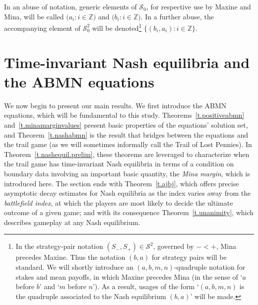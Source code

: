 \documentclass[letterpaper,11pt,oneside,reqno]{amsbook}
\newcommand{\Z}{\ensuremath{\mathbb{Z}}}
\numberwithin{figure}{chapter}
\theoremstyle{definition}
\theoremstyle{definition}
\theoremstyle{definition}
\theoremstyle{definition}
\theoremstyle{definition}
\newcommand{\mc}{\mathcal}
\newcommand{\tis}{\mc{S}_0}
\newcommand{\abmnmacspace}{\textrm{ABMN} }
\def\hfff#1{\label{#1}}
\begin{document}
In an abuse of notation,
generic elements of $\tis$, for respective use by Maxine and Mina, will be called
 $\big(a_i:i\in \Z)$ and  $\big(b_i:i\in \Z \big)$. In a further abuse,\hfff{notab} the accompanying element of $\tis^2$
 will be denoted\footnote{In the strategy-pair notation $(S_-,S_+) \in \mc{S}^2$, governed by $- < +$, Mina precedes Maxine. Thus the notation $(b,a)$ for strategy pairs will be standard. We will shortly introduce an $(a,b,m,n)$-quadruple notation for stakes and mean payoffs, in which Maxine precedes Mina (in the sense of `$a$ before $b$' and `$m$ before $n$'). As a result, usages of the form `$(a,b,m,n)$ is the quadruple associated to the Nash equilibrium $(b,a)$' will be made.}   
$\big\{ (b_i,a_i): i \in \Z \big\}$. 

 
 \section{Time-invariant Nash equilibria and the \abmnmacspace  equations}

We now begin to present our main results. We first introduce the \abmnmacspace  equations, which will be fundamental to this study. Theorems~\ref{t.positiveabmn}
 and~\ref{t.minamarginvalues} present basic properties of the equations' solution set, and Theorem~\ref{t.nashabmn}
 is the result that bridges between the equations and the trail game (as we will sometimes informally call the Trail of Lost Pennies). In Theorem~\ref{t.nashequil.prelim}, these theorems are leveraged to characterize when the trail game has time-invariant Nash equilibria in terms of a condition on boundary data involving an important basic quantity, the {\em Mina margin}, which is introduced here. The section ends with Theorem~\ref{t.ajbj}, which offers precise asymptotic decay estimates for Nash equilibria as the index varies away from the {\em battlefield index}, at which the players are most likely to decide the ultimate outcome of a given game; and with its consequence Theorem~\ref{t.unanimity}, which describes gameplay at any Nash equilibrium. 
 
\end{document}
